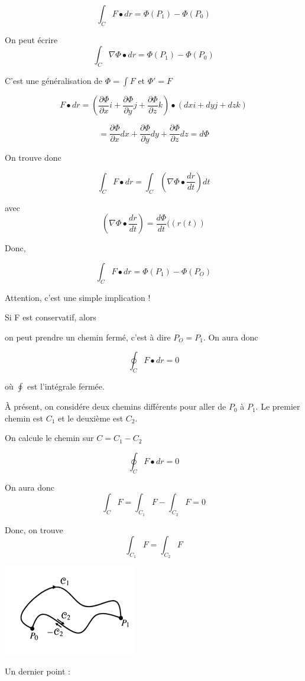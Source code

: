 \[\int_C F\bullet dr = \Phi ( P_1 ) - \Phi ( P_0) \]

On peut écrire
\[\int_C \nabla \Phi \bullet dr =  \Phi ( P_1 ) - \Phi ( P_0) \]

C'est une généralisation de $\Phi = \int F $ et $\Phi ' = F $

\[F\bullet dr = \left( \frac{\partial \Phi }{\partial x} i + \frac{\partial \Phi }{\partial y} j +\frac{\partial \Phi }{\partial z} k \right)\bullet (  dx i + dy j + dz k )\]

\[=\frac{\partial \Phi}{\partial x}dx + \frac{\partial \Phi}{\partial y}dy +\frac{\partial \Phi}{\partial z}dz = d\Phi\]

On trouve donc

\[\int_C F\bullet dr = \int_C ( \nabla \Phi \bullet \frac{dr}{dt} ) dt \]

avec \[( \nabla \Phi \bullet \frac{dr}{dt} )= \frac{d\Phi}{dt}((r(t))\]

Donc,

\[\int_C F\bullet dr = \Phi ( P_1 ) - \Phi ( P_O) \]

Attention, c'est une simple implication !

Si F est conservatif, alors

on peut prendre un chemin fermé, c'est à dire $P_O = P_1$. On aura donc

\[\oint _C F\bullet dr = 0\]

où $ \oint $ est l'intégrale fermée.

À présent, on considére deux chemins différents pour aller de $P_0$ à $P_1$. Le premier chemin est $C_1$ et le deuxième est $C_2$.

On calcule le chemin sur $C = C_1-C_2$

\[\oint _C F\bullet dr = 0\]

On aura donc \[\int_C F = \int_{C_1} F - \int_{C_2} F = 0\]

Donc, on trouve
\[\int_{C_1} F = \int_{C_2} F \]

\includegraphics[scale=1]{image3.png}

Un dernier point :


